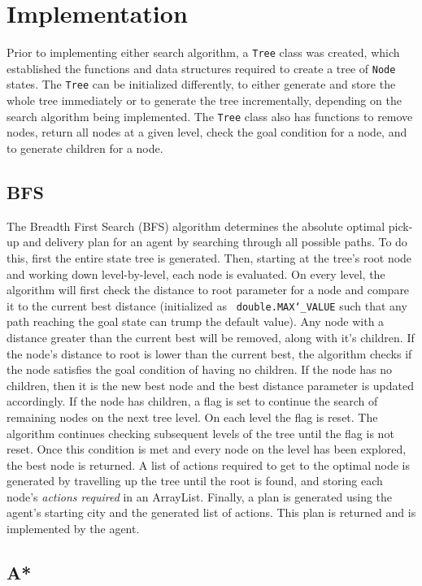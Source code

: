 \documentclass[11pt]{article}
\begin{document}
\section{Implementation}
Prior to implementing either search algorithm, a \texttt{Tree} class was created, which established the functions and data structures required to create a tree of \texttt{Node} states. The \texttt{Tree} can be initialized differently, to either generate and store the whole tree immediately or to generate the tree incrementally, depending on the search algorithm being implemented. The \texttt{Tree} class also has functions to remove nodes, return all nodes at a given level, check the goal condition for a node, and to generate children for a node. 
\subsection{BFS}
The Breadth First Search (BFS) algorithm determines the absolute optimal pick-up and delivery plan for an agent by searching through all possible paths. To do this, first the entire state tree is generated. Then, starting at the tree's root node and working down level-by-level, each node is evaluated. On every level, the algorithm will first check the distance to root parameter for a node and compare it to the current best distance (initialized as \texttt{ double.MAX\char`_VALUE} such that any path reaching the goal state can trump the default value). Any node with a distance greater than the current best will be removed, along with it's children. If the node's distance to root is lower than the current best, the algorithm checks if the node satisfies the goal condition of having no children. If the node has no children, then it is the new best node and the best distance parameter is updated accordingly. If the node has children, a flag is set to continue the search of remaining nodes on the next tree level. On each level the flag is reset. The algorithm continues checking subsequent levels of the tree until the flag is not reset. Once this condition is met and every node on the level has been explored, the best node is returned. A list of actions required to get to the optimal node is generated by travelling up the tree until the root is found, and storing each node's \textit{actions required} in an ArrayList. Finally, a plan is generated using the agent's starting city and the generated list of actions. This plan is returned and is implemented by the agent. 
\subsection{A*}
\end{document}
